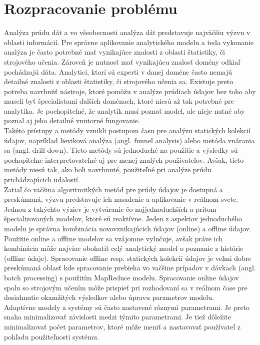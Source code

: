 \documentclass[11pt]{article}
\begin{document}
\section{Rozpracovanie problému}
Analýza prúdu dát a vo všeobecnosti analýza dát predstavuje najväčšiu výzvu v oblasti informácií. Pre správne aplikovanie analytického modelu a teda vykonanie analýza je často potrebné mať vynikajúce znalosti z oblasti štatistiky, či strojového učenia. Zároveň je nutnosť mať vynikajúcu znalosť domény odkiaľ pochádzajú dáta. Analytici, ktorí sú experti v danej doméne často nemajú detailné znalosti z oblasti štatistiky, či strojového učenia sa. Existuje preto potreba navrhnúť nástroje, ktoré pomôžu v analýze prúdiach údajov bez toho aby museli byť špecialistami ďalších doménach, ktoré niesú až tak potrebné pre analytika. Je pochopiteľné, že analytik musí poznať model, ale nieje nutné aby poznal aj jeho detailné vnutorné fungovanie.\\

Takéto prístupy a metódy vznikli postupom času pre analýzu statických kolekcií údajov, napríklad lieviková analýza (angl. funnel analysis) alebo metóda vnárania sa (angl. drill down). Tieto metódy sú jednoduché na použitie a výsledky sú pochopiteľne interpretovateľné aj pre menej znalých používateľov. Avšak, tieto metódy niesú tak, ako boli navrhnuté, použiteľné pri analýze prúdu prichádzajúcich udalostí.\\

Zatiaľ čo väčšina algoritmitkých metód pre prúdy údajov je dostupná a preskúmaná, výzvu predstavuje ich nasadenie a aplikovanie v reálnom svete. Jednou z takýchto výziev je vytváranie čo najjednoduchších a pritom špecializovaných modelov, ktoré sú reaktívne. Jeden z aspektov jednoduchého modelu je správna kombinácia novovznikajúcich údajov (online) a offline údajov.\\

Použitie online a offline modelov sa vzájomne vylučuje, avšak práve ich kombinácia môže najviac obohatiť celý analytický model o poznanie z histórie (offline údaje). Spracovanie offline resp. statických kolekcií údajov je veľmi dobre preskúmaná oblasť kde spracovanie prebieha vo vačšine prípadov v dávkach (angl. batch processing) s použitím MapReduce modelu. Spracovanie online údajov spolu so strojovým učením môže prispieť pri rozhodovaní sa v reálnom čase pre dosiahnutie okamžitých výsledkov alebo úpravu parametrov modelu.\\

Adaptívne modely a systémy sú často nastavené rôznymi parametrami. Je preto snaha minimalizovať závislosti medzi týmito parametrami. Je tiež dôležite minimalizovať počet parametrov, ktoré môže meniť a nastavovať používateľ z pohľadu použiteľnosti systému.
\end{document}
